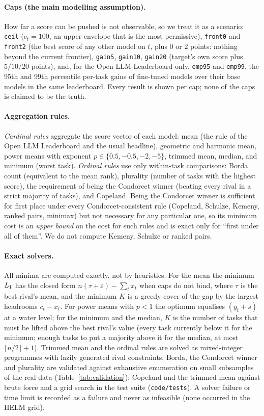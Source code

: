 \paragraph{Caps (the main modelling assumption).}
How far a score can be pushed is not observable, so we treat it as a scenario: \texttt{ceil} ($c_t=100$, an upper envelope that is the most permissive), \texttt{front0} and \texttt{front2} (the best score of any other model on $t$, plus $0$ or $2$ points: nothing beyond the current frontier), \texttt{gain5}, \texttt{gain10}, \texttt{gain20} (target's own score plus $5/10/20$ points), and, for the Open LLM Leaderboard only, \texttt{emp95} and \texttt{emp99}, the 95th and 99th percentile per-task gains of fine-tuned models over their base models in the same leaderboard. Every result is shown per cap; none of the caps is claimed to be the truth.

\paragraph{Aggregation rules.}
\emph{Cardinal rules} aggregate the score vector of each model: mean (the rule of the Open LLM Leaderboard and the usual headline), geometric and harmonic mean, power means with exponent $p\in\{0.5,-0.5,-2,-5\}$, trimmed mean, median, and minimum (worst task). \emph{Ordinal rules} use only within-task comparisons: Borda count (equivalent to the mean rank), plurality (number of tasks with the highest score), the requirement of being the Condorcet winner (beating every rival in a strict majority of tasks), and Copeland. Being the Condorcet winner is sufficient for first place under every Condorcet-consistent rule (Copeland, Schulze, Kemeny, ranked pairs, minimax) but not necessary for any particular one, so its minimum cost is an \emph{upper bound} on the cost for such rules and is exact only for ``first under all of them''. We do not compute Kemeny, Schulze or ranked pairs.

\paragraph{Exact solvers.}
All minima are computed exactly, not by heuristics. For the mean the minimum $L_1$ has the closed form $n(\tau+\varepsilon)-\sum_t x_t$ when caps do not bind, where $\tau$ is the best rival's mean, and the minimum $K$ is a greedy cover of the gap by the largest headrooms $c_t-x_t$. For power means with $p<1$ the optimum equalises $(y_t+s)$ at a water level; for the minimum and the median, $K$ is the number of tasks that must be lifted above the best rival's value (every task currently below it for the minimum; enough tasks to put a majority above it for the median, at most $\lfloor n/2\rfloor+1$). Trimmed mean and the ordinal rules are solved as mixed-integer programmes with lazily generated rival constraints, Borda, the Condorcet winner and plurality are validated against exhaustive enumeration on small subsamples of the real data (Table~\ref{tab:validation}); Copeland and the trimmed mean against brute force and a grid search in the test suite (\texttt{code/tests}). A solver failure or time limit is recorded as a failure and never as infeasible (none occurred in the HELM grid).
